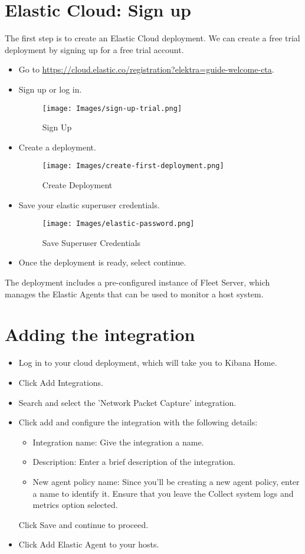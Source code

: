\documentclass{report}
\begin{document}
\section{Elastic Cloud: Sign up}
The first step is to create an Elastic Cloud deployment. 
We can create a free trial deployment by signing up for a free trial account.
\begin{itemize}
	\item Go to \url{https://cloud.elastic.co/registration?elektra=guide-welcome-cta}.
	\item Sign up or log in.
	\begin{figure}[!h]
		\centering
		\texttt{[image: Images/sign-up-trial.png]}
		\caption{Sign Up}
		\label{fig:Sign Up}
	\end{figure}
	\item Create a deployment.
	\begin{figure}[!h]
		\centering
		\texttt{[image: Images/create-first-deployment.png]}
		\caption{Create Deployment}
		\label{fig:Create Deployment}
	\end{figure}
	\item Save your elastic superuser credentials.
	\begin{figure}[!h]
		\centering
		\texttt{[image: Images/elastic-password.png]}
            \caption{Save Superuser Credentials}
		\label{fig:Save Superuser Credentials}
	\end{figure}
	\item Once the deployment is ready, select continue.
\end{itemize}

The deployment includes a pre-configured instance of Fleet Server, 
which manages the Elastic Agents that can be used to monitor a host system.

\section{Adding the integration}
\begin{itemize}
	\item Log in to your cloud deployment, which will take you to Kibana Home.
	\item Click Add Integrations.
	\item Search and select the 'Network Packet Capture' integration.
	\item Click add and configure the integration with the following details:
	\begin{itemize}
		\item Integration name: Give the integration a name.
		\item Description: Enter a brief description of the integration.
		\item New agent policy name: Since you'll be creating a new agent policy, enter a name to identify it. 
		Ensure that you leave the Collect system logs and metrics option selected.
	\end{itemize}
	Click Save and continue to proceed.
	\item Click Add Elastic Agent to your hosts.
\end{itemize}
\end{document}
